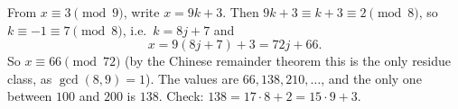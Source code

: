 From $x\equiv3\pmod9$, write $x=9k+3$. Then $9k+3\equiv k+3\equiv2\pmod 8$, so $k\equiv-1\equiv7\pmod8$, i.e.\ $k=8j+7$ and
\[
x=9(8j+7)+3=72j+66 .
\]
So $x\equiv66\pmod{72}$ (by the Chinese remainder theorem this is the only residue class, as $\gcd(8,9)=1$). The values are $66,138,210,\dots$, and the only one between $100$ and $200$ is $\boxed{138}$. Check: $138=17\cdot8+2=15\cdot9+3$.
